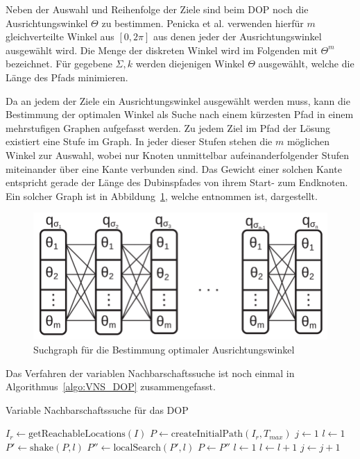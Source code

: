 \documentclass[12pt,a4paper,twoside]{article}
\theoremstyle{definition}
\numberwithin{equation}{section}
\begin{document}
Neben der Auswahl und Reihenfolge der Ziele sind beim DOP noch die Ausrichtungswinkel $\Theta$ zu bestimmen. Penicka et al. verwenden hierfür $m$ gleichverteilte Winkel aus $[0,2\pi]$ aus denen jeder der Ausrichtungswinkel ausgewählt wird. Die Menge der diskreten Winkel wird im Folgenden mit $\Theta^m$ bezeichnet. Für gegebene $\Sigma, k$ werden  diejenigen Winkel $\Theta$ ausgewählt, welche die Länge des Pfads minimieren.

Da an jedem der Ziele ein Ausrichtungswinkel ausgewählt werden muss, kann die Bestimmung der optimalen Winkel als Suche nach einem kürzesten Pfad in einem mehrstufigen Graphen aufgefasst werden. Zu jedem Ziel im Pfad der Lösung existiert eine Stufe im Graph. In jeder dieser Stufen stehen die $m$ möglichen Winkel zur Auswahl, wobei nur Knoten unmittelbar aufeinanderfolgender Stufen miteinander über eine Kante verbunden sind. Das Gewicht einer solchen Kante entspricht gerade der Länge des Dubinspfades von ihrem Start- zum Endknoten. Ein solcher Graph ist in Abbildung~\ref{fig:search_graph.png}, welche  \cite{R.Penicka.2017} entnommen ist, dargestellt.

\begin{figure}[h]
	\begin{center}
		\includegraphics[scale=0.8]{search_graph.png}
	\end{center}
	\caption{Suchgraph für die Bestimmung optimaler Ausrichtungswinkel}
	\label{fig:search_graph.png}
\end{figure}

Das Verfahren der variablen Nachbarschaftssuche ist noch einmal in Algorithmus~\ref{algo:VNS_DOP} zusammengefasst.

\begin{algorithm}
	\caption{Variable Nachbarschaftssuche für das DOP}
	\begin{algorithmic}
		\State $I_r \gets \text{getReachableLocations}(I)$
		\State $P \gets \text{createInitialPath}(I_r,T_{max})$
		\State $j \gets 1$
		\State $l \gets 1$
		\State $P' \gets \text{shake}(P,l)$
		\State $P'' \gets \text{localSearch}(P',l)$
		\State $P \gets P''$
		\State $l \gets 1$
		\Else
		\State $l \gets l + 1$
		\EndIf
		\State $j \gets j + 1$
		\EndWhile
		\EndWhile
	\end{algorithmic}
	\label{algo:VNS_DOP}
\end{algorithm}
\end{document}
